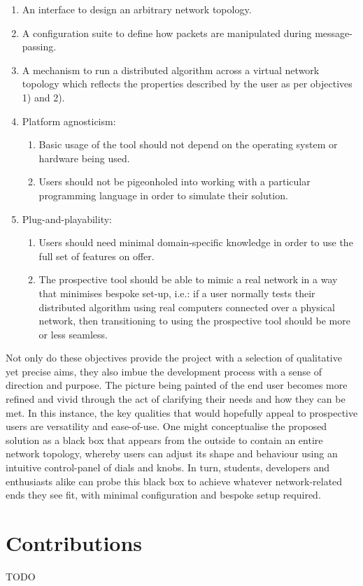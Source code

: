 \begin{enumerate}
    \item An interface to design an arbitrary network topology.
    \item A configuration suite to define how packets are manipulated during message-passing.
    \item A mechanism to run a distributed algorithm across a virtual network topology which reflects the properties
    described by the user as per objectives 1) and 2).
    \item Platform agnosticism:
    \begin{enumerate}
        \item Basic usage of the tool should not depend on the operating system or hardware being used.
        \item Users should not be pigeonholed into working with a particular programming language in order to
        simulate their solution.
    \end{enumerate}
    \item Plug-and-playability:
    \begin{enumerate}
        \item Users should need minimal domain-specific knowledge in order to use the full set of features on offer.
        \item The prospective tool should be able to mimic a real network in a way that minimises bespoke set-up,
        i.e.: if a user normally tests their distributed algorithm using real computers connected over a physical
        network, then transitioning to using the prospective tool should be more or less seamless.
    \end{enumerate}
\end{enumerate}

Not only do these objectives provide the project with a selection of qualitative yet precise aims, they also imbue
the development process with a sense of direction and purpose. The picture being painted of the end user becomes more
refined and vivid through the act of clarifying their needs and how they can be met. In this instance, the key
qualities that would hopefully appeal to prospective users are versatility and ease-of-use. One might conceptualise
the proposed solution as a black box that appears from the outside to contain an entire network topology, whereby
users can adjust its shape and behaviour using an intuitive control-panel of dials and knobs. In turn, students,
developers and enthusiasts alike can probe this black box to achieve whatever network-related ends they see fit, with
minimal configuration and bespoke setup required.


\section{Contributions}\label{section:contributions}

TODO
